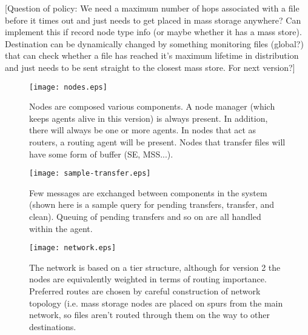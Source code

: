 \documentclass{cmspaper}
\begin{document}
[Question of policy: We need a maximum number of hops associated with
a file before it times out and just needs to get placed in mass
storage anywhere? Can implement this if record node type info (or
maybe whether it has a mass store). Destination can be dynamically
changed by something monitoring files (global?) that can check whether
a file has reached it's maximum lifetime in distribution and just
needs to be sent straight to the closest mass store. For next
version?]

\clearpage
\begin{figure}
\centering
\texttt{[image: nodes.eps]}
\caption{Nodes are composed various components. A node manager (which keeps agents alive in this version) is always present. In addition, there will always be one or more agents. In nodes that act as routers, a routing agent will be present. Nodes that transfer files will have some form of buffer (SE, MSS...).}
\label{nodes}
\end{figure}

\clearpage
\begin{figure}
\centering
\texttt{[image: sample-transfer.eps]}
\caption{Few messages are exchanged between components in the system (shown here is a sample query for pending transfers, transfer, and clean). Queuing of pending transfers and so on are all handled within the agent.}
\label{sample-transfer}
\end{figure}

\clearpage
\begin{figure}
\centering
\texttt{[image: network.eps]}
\caption{The network is based on a tier structure, although for version 2 the nodes are equivalently weighted in terms of routing importance. Preferred routes are chosen by careful construction of network topology (i.e. mass storage nodes are placed on spurs from the main network, so files aren't routed through them on the way to other destinations.}
\label{network}
\end{figure}
\end{document}
